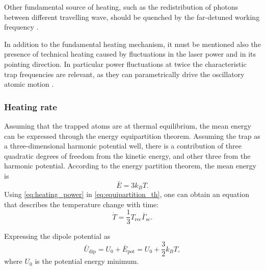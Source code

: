 Other fundamental source of heating, such as the redistribution of photons between different travelling wave, should be quenched by the far-detuned working frequency \cite{grimm}.

In addition to the fundamental heating mechanism, it must be mentioned also the presence of technical heating caused by fluctuations in the laser power and in its pointing direction. In particular power fluctuations at twice the characteristic trap frequencies are relevant, as they can parametrically drive the oscillatory atomic motion \cite{Savard:97}.

\subsubsection{Heating rate}
Assuming that the trapped atoms are at thermal equilibrium, the mean energy can be expressed through the energy equipartition theorem. Assuming the trap as a three-dimensional harmonic potential well, there is a contribution of three quadratic degrees of freedom from the kinetic energy, and other three from the harmonic potential. According to the energy partition theorem, the mean energy is
\begin{equation}
    \label{eq:equipartition_th}
    \bar{E}= 3 k_B T.
\end{equation}
Using \eqref{eq:heating_power} in \eqref{eq:equipartition_th}, one can obtain an equation that describes the temperature change with time:
\begin{equation}
    \label{eq:temperature_changing_rate}
    \dot{T} = \frac{1}{3} T_\text{rec} \bar{\Gamma}_\text{sc}.
\end{equation}

Expressing the dipole potential as
\begin{equation}
    \label{eq:mean_scattering_rate_td}
    \bar{U}_\text{dip} = U_0 + \bar{E}_\text{pot} = U_0 + \frac{3}{2}k_B T,
\end{equation}
where $U_0$ is the potential energy minimum.


